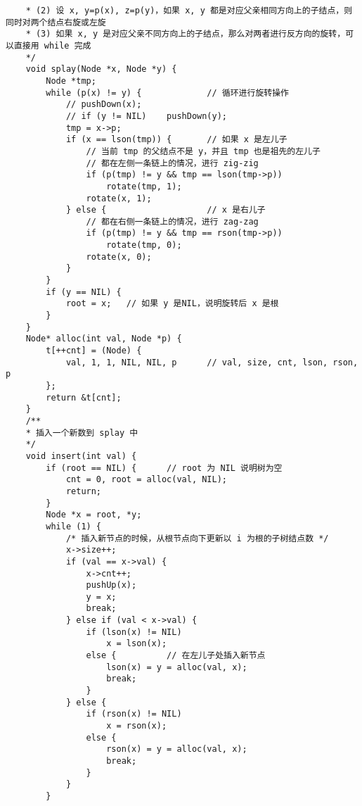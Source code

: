 \begin{verbatim}
    * (2) 设 x, y=p(x), z=p(y)，如果 x, y 都是对应父亲相同方向上的子结点，则同时对两个结点右旋或左旋
    * (3) 如果 x, y 是对应父亲不同方向上的子结点，那么对两者进行反方向的旋转，可以直接用 while 完成 
    */
    void splay(Node *x, Node *y) {
        Node *tmp;
        while (p(x) != y) {             // 循环进行旋转操作 
            // pushDown(x);
            // if (y != NIL)    pushDown(y);
            tmp = x->p;
            if (x == lson(tmp)) {       // 如果 x 是左儿子 
                // 当前 tmp 的父结点不是 y，并且 tmp 也是祖先的左儿子 
                // 都在左侧一条链上的情况，进行 zig-zig 
                if (p(tmp) != y && tmp == lson(tmp->p))
                    rotate(tmp, 1);
                rotate(x, 1);
            } else {                    // x 是右儿子 
                // 都在右侧一条链上的情况，进行 zag-zag 
                if (p(tmp) != y && tmp == rson(tmp->p))
                    rotate(tmp, 0);
                rotate(x, 0);
            }
        }
        if (y == NIL) {
            root = x;   // 如果 y 是NIL，说明旋转后 x 是根 
        }
    }
    Node* alloc(int val, Node *p) {
        t[++cnt] = (Node) {
            val, 1, 1, NIL, NIL, p      // val, size, cnt, lson, rson, p
        };
        return &t[cnt];
    }
    /**
    * 插入一个新数到 splay 中 
    */
    void insert(int val) {
        if (root == NIL) {      // root 为 NIL 说明树为空 
            cnt = 0, root = alloc(val, NIL);
            return;
        }
        Node *x = root, *y;
        while (1) {
            /* 插入新节点的时候，从根节点向下更新以 i 为根的子树结点数 */
            x->size++;
            if (val == x->val) {
                x->cnt++;
                pushUp(x);
                y = x;
                break;
            } else if (val < x->val) {
                if (lson(x) != NIL)
                    x = lson(x);
                else {          // 在左儿子处插入新节点 
                    lson(x) = y = alloc(val, x);
                    break;
                }
            } else {
                if (rson(x) != NIL)
                    x = rson(x);
                else {
                    rson(x) = y = alloc(val, x);
                    break;
                }
            }
        }
        

\end{verbatim}
